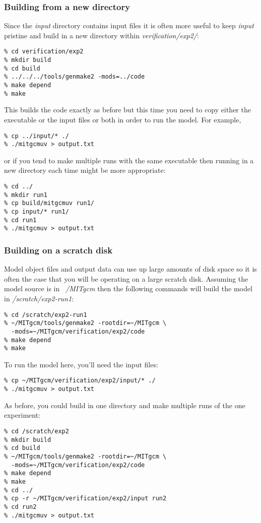 \subsubsection{Building from a new directory}

Since the {\em input} directory contains input files it is often more
useful to keep {\em input} pristine and build in a new directory
within {\em verification/exp2/}:
\begin{verbatim}
% cd verification/exp2
% mkdir build
% cd build
% ../../../tools/genmake2 -mods=../code
% make depend
% make
\end{verbatim}
This builds the code exactly as before but this time you need to copy
either the executable or the input files or both in order to run the
model. For example,
\begin{verbatim}
% cp ../input/* ./
% ./mitgcmuv > output.txt
\end{verbatim}
or if you tend to make multiple runs with the same executable then
running in a new directory each time might be more appropriate:
\begin{verbatim}
% cd ../
% mkdir run1
% cp build/mitgcmuv run1/
% cp input/* run1/
% cd run1
% ./mitgcmuv > output.txt
\end{verbatim}

\subsubsection{Building on a scratch disk}

Model object files and output data can use up large amounts of disk
space so it is often the case that you will be operating on a large
scratch disk. Assuming the model source is in {\em ~/MITgcm} then the
following commands will build the model in {\em /scratch/exp2-run1}:
\begin{verbatim}
% cd /scratch/exp2-run1
% ~/MITgcm/tools/genmake2 -rootdir=~/MITgcm \
  -mods=~/MITgcm/verification/exp2/code
% make depend
% make
\end{verbatim}
To run the model here, you'll need the input files:
\begin{verbatim}
% cp ~/MITgcm/verification/exp2/input/* ./
% ./mitgcmuv > output.txt
\end{verbatim}

As before, you could build in one directory and make multiple runs of
the one experiment:
\begin{verbatim}
% cd /scratch/exp2
% mkdir build
% cd build
% ~/MITgcm/tools/genmake2 -rootdir=~/MITgcm \
  -mods=~/MITgcm/verification/exp2/code
% make depend
% make
% cd ../
% cp -r ~/MITgcm/verification/exp2/input run2
% cd run2
% ./mitgcmuv > output.txt
\end{verbatim}



